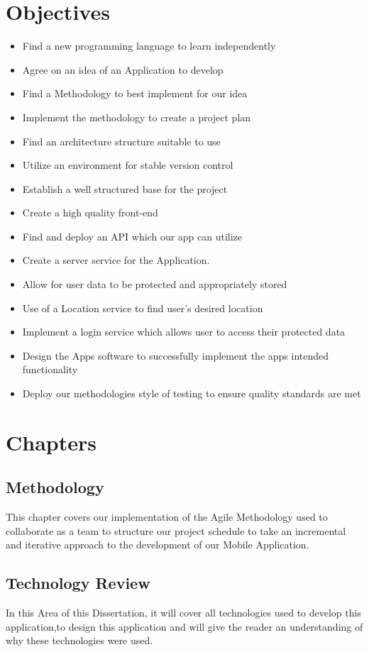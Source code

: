\section{Objectives}
\begin{itemize}
    \item Find a new programming language to learn independently
    \item Agree on an idea of an Application to develop
    \item Find a Methodology to best implement for our idea
    \item Implement the methodology to create a project plan
    \item Find an architecture structure suitable to use
    \item Utilize an environment for stable version control
    \item Establish a well structured base for the project
    \item Create a high quality front-end
    \item Find and deploy an API which our app can utilize
    \item Create a server service for the Application.
    \item Allow for user data to be protected and appropriately stored
    \item Use of a Location service to find user's desired location
    \item Implement a login service which allows user to access their protected data
    \item Design the Apps software to successfully implement the apps intended functionality 
    \item Deploy our methodologies style of testing to ensure quality standards are met
    
\end{itemize}
\section{Chapters}
\subsection{Methodology}
This chapter covers our implementation of the Agile Methodology used to collaborate as a team to structure our project schedule to take an incremental and iterative approach to the development of our Mobile Application.
\subsection{Technology Review}
In this Area of this Dissertation, it will cover all technologies used to develop this application,to design this application and will give the reader an understanding of why these technologies were used.
